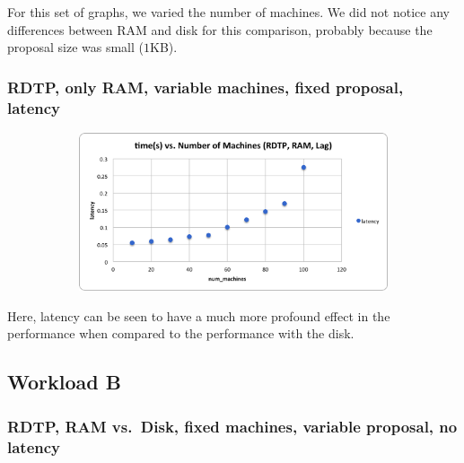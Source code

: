 \documentclass[12pt,]{article}
\begin{document}
For this set of graphs, we varied the number of machines. We did not notice any differences between RAM and disk for this comparison, probably because the proposal size was small ($1$KB).

\subsubsection{RDTP, only RAM, variable machines, fixed proposal,
latency}\label{rdtp-ram-vs.disk-variable-machines-fixed-proposal-latency}

\begin{figure}[H]
\centering
\begin{subfigure}{.8\textwidth}
    \centering
    \includegraphics[width=1.0\textwidth]{RAM_RDTP_variable_machines_fixed_proposal_latency.png}
\end{subfigure}
\end{figure}

Here, latency can be seen to have a much more profound effect in the performance when compared to the performance with the disk.

\subsection{Workload B}\label{workload-b}

\subsubsection{RDTP, RAM vs.~Disk, fixed machines, variable proposal, no
latency}\label{rdtp-ram-vs.disk-fixed-machines-variable-proposal-no-latency-1}
\end{document}
